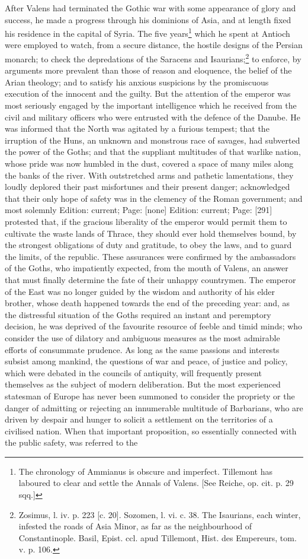 After Valens had terminated the Gothic war with some appearance of glory and success, he made a progress through his dominions of Asia, and at length fixed his residence in the capital of Syria. The five years\footnote{The chronology of Ammianus is obscure and imperfect. Tillemont has laboured to clear and settle the Annals of Valens. [See Reiche, op. cit. p. 29 sqq.]} which he spent at Antioch were employed to watch, from a secure distance, the hostile designs of the Persian monarch; to check the depredations of the Saracens and Isaurians;\footnote{Zosimus, l. iv. p. 223 [c. 20]. Sozomen, l. vi. c. 38. The Isaurians, each winter, infested the roads of Asia Minor, as far as the neighbourhood of Constantinople. Basil, Epist. ccl. apud Tillemont, Hist. des Empereurs, tom. v. p. 106.} to enforce, by arguments more prevalent than those of reason and eloquence, the belief of the Arian theology; and to satisfy his anxious suspicions by the promiscuous execution of the innocent and the guilty. But the attention of the emperor was most seriously engaged by the important intelligence which he received from the civil and military officers who were entrusted with the defence of the Danube. He was informed that the North was agitated by a furious tempest; that the irruption of the Huns, an unknown and monstrous race of savages, had subverted the power of the Goths; and that the suppliant multitudes of that warlike nation, whose pride was now humbled in the dust, covered a space of many miles along the banks of the river. With outstretched arms and pathetic lamentations, they loudly deplored their past misfortunes and their present danger; acknowledged that their only hope of safety was in the clemency of the Roman government; and most solemnly Edition: current; Page: [none] Edition: current; Page: [291] protested that, if the gracious liberality of the emperor would permit them to cultivate the waste lands of Thrace, they should ever hold themselves bound, by the strongest obligations of duty and gratitude, to obey the laws, and to guard the limits, of the republic. These assurances were confirmed by the ambassadors of the Goths, who impatiently expected, from the mouth of Valens, an answer that must finally determine the fate of their unhappy countrymen. The emperor of the East was no longer guided by the wisdom and authority of his elder brother, whose death happened towards the end of the preceding year: and, as the distressful situation of the Goths required an instant and peremptory decision, he was deprived of the favourite resource of feeble and timid minds; who consider the use of dilatory and ambiguous measures as the most admirable efforts of consummate prudence. As long as the same passions and interests subsist among mankind, the questions of war and peace, of justice and policy, which were debated in the councils of antiquity, will frequently present themselves as the subject of modern deliberation. But the most experienced statesman of Europe has never been summoned to consider the propriety or the danger of admitting or rejecting an innumerable multitude of Barbarians, who are driven by despair and hunger to solicit a settlement on the territories of a civilised nation. When that important proposition, so essentially connected with the public safety, was referred to the 